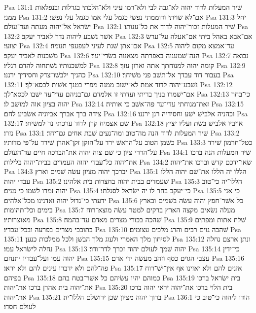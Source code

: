 Psa 131:1  שׁיר המעלות לדוד יהוה לא־גבה לבי ולא־רמו עיני ולא־הלכתי בגדלות ובנפלאות ממני׃
Psa 131:2  אם־לא שׁויתי ודוממתי נפשׁי כגמל עלי אמו כגמל עלי נפשׁי׃
Psa 131:3  יחל ישׂראל אל־יהוה מעתה ועד־עולם׃
Psa 132:1  שׁיר המעלות זכור־יהוה לדוד את כל־ענותו׃
Psa 132:2  אשׁר נשׁבע ליהוה נדר לאביר יעקב׃
Psa 132:3  אם־אבא באהל ביתי אם־אעלה על־ערשׂ יצועי׃
Psa 132:4  אם־אתן שׁנת לעיני לעפעפי תנומה׃
Psa 132:5  עד־אמצא מקום ליהוה משׁכנות לאביר יעקב׃
Psa 132:6  הנה־שׁמענוה באפרתה מצאנוה בשׂדי־יער׃
Psa 132:7  נבואה למשׁכנותיו נשׁתחוה להדם רגליו׃
Psa 132:8  קומה יהוה למנוחתך אתה וארון עזך׃
Psa 132:9  כהניך ילבשׁו־צדק וחסידיך ירננו׃
Psa 132:10  בעבור דוד עבדך אל־תשׁב פני משׁיחך׃
Psa 132:11  נשׁבע־יהוה לדוד אמת לא־ישׁוב ממנה מפרי בטנך אשׁית לכסא־לך׃
Psa 132:12  אם־ישׁמרו בניך בריתי ועדתי זו אלמדם גם־בניהם עדי־עד ישׁבו לכסא־לך׃
Psa 132:13  כי־בחר יהוה בציון אוה למושׁב לו׃
Psa 132:14  זאת־מנוחתי עדי־עד פה־אשׁב כי אותיה׃
Psa 132:15  צידה ברך אברך אביוניה אשׂביע לחם׃
Psa 132:16  וכהניה אלבישׁ ישׁע וחסידיה רנן ירננו׃
Psa 132:17  שׁם אצמיח קרן לדוד ערכתי נר למשׁיחי׃
Psa 132:18  אויביו אלבישׁ בשׁת ועליו יציץ נזרו׃
Psa 133:1  שׁיר המעלות לדוד הנה מה־טוב ומה־נעים שׁבת אחים גם־יחד׃
Psa 133:2  כשׁמן הטוב על־הראשׁ ירד על־הזקן זקן־אהרן שׁירד על־פי מדותיו׃
Psa 133:3  כטל־חרמון שׁירד על־הררי ציון כי שׁם צוה יהוה את־הברכה חיים עד־העולם׃
Psa 134:1  שׁיר המעלות הנה ברכו את־יהוה כל־עבדי יהוה העמדים בבית־יהוה בלילות׃
Psa 134:2  שׂאו־ידכם קדשׁ וברכו את־יהוה׃
Psa 134:3  יברכך יהוה מציון עשׂה שׁמים וארץ׃
Psa 135:1  הללו יה הללו את־שׁם יהוה הללו עבדי יהוה׃
Psa 135:2  שׁעמדים בבית יהוה בחצרות בית אלהינו׃
Psa 135:3  הללו־יה כי־טוב יהוה זמרו לשׁמו כי נעים׃
Psa 135:4  כי־יעקב בחר לו יה ישׂראל לסגלתו׃
Psa 135:5  כי אני ידעתי כי־גדול יהוה ואדנינו מכל־אלהים׃
Psa 135:6  כל אשׁר־חפץ יהוה עשׂה בשׁמים ובארץ בימים וכל־תהומות׃
Psa 135:7  מעלה נשׂאים מקצה הארץ ברקים למטר עשׂה מוצא־רוח מאוצרותיו׃
Psa 135:8  שׁהכה בכורי מצרים מאדם עד־בהמה׃
Psa 135:9  שׁלח אתות ומפתים בתוככי מצרים בפרעה ובכל־עבדיו׃
Psa 135:10  שׁהכה גוים רבים והרג מלכים עצומים׃
Psa 135:11  לסיחון מלך האמרי ולעוג מלך הבשׁן ולכל ממלכות כנען׃
Psa 135:12  ונתן ארצם נחלה נחלה לישׂראל עמו׃
Psa 135:13  יהוה שׁמך לעולם יהוה זכרך לדר־ודר׃
Psa 135:14  כי־ידין יהוה עמו ועל־עבדיו יתנחם׃
Psa 135:15  עצבי הגוים כסף וזהב מעשׂה ידי אדם׃
Psa 135:16  פה־להם ולא ידברו עינים להם ולא יראו׃
Psa 135:17  אזנים להם ולא יאזינו אף אין־ישׁ־רוח בפיהם׃
Psa 135:18  כמוהם יהיו עשׂיהם כל אשׁר־בטח בהם׃
Psa 135:19  בית ישׂראל ברכו את־יהוה בית אהרן ברכו את־יהוה׃
Psa 135:20  בית הלוי ברכו את־יהוה יראי יהוה ברכו את־יהוה׃
Psa 135:21  ברוך יהוה מציון שׁכן ירושׁלם הללו־יה׃
Psa 136:1  הודו ליהוה כי־טוב כי לעולם חסדו׃
